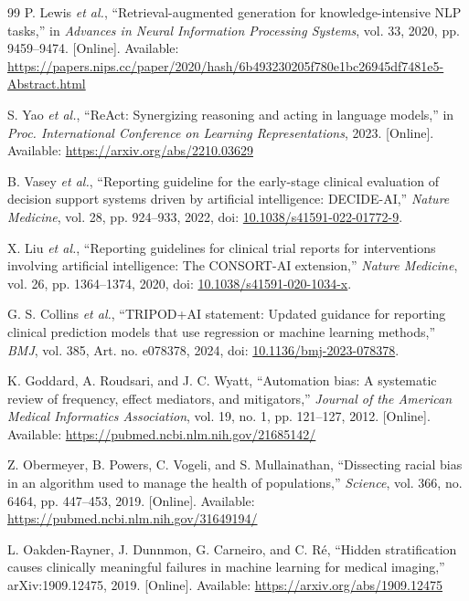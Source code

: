 \documentclass[conference]{IEEEtran}
\begin{document}
\begin{thebibliography}{99}
P. Lewis \emph{et al.}, ``Retrieval-augmented generation for knowledge-intensive NLP tasks,'' in \emph{Advances in Neural Information Processing Systems}, vol. 33, 2020, pp. 9459--9474. [Online]. Available: \url{https://papers.nips.cc/paper/2020/hash/6b493230205f780e1bc26945df7481e5-Abstract.html}

S. Yao \emph{et al.}, ``ReAct: Synergizing reasoning and acting in language models,'' in \emph{Proc. International Conference on Learning Representations}, 2023. [Online]. Available: \url{https://arxiv.org/abs/2210.03629}

B. Vasey \emph{et al.}, ``Reporting guideline for the early-stage clinical evaluation of decision support systems driven by artificial intelligence: DECIDE-AI,'' \emph{Nature Medicine}, vol. 28, pp. 924--933, 2022, doi: \href{https://doi.org/10.1038/s41591-022-01772-9}{10.1038/s41591-022-01772-9}.

X. Liu \emph{et al.}, ``Reporting guidelines for clinical trial reports for interventions involving artificial intelligence: The CONSORT-AI extension,'' \emph{Nature Medicine}, vol. 26, pp. 1364--1374, 2020, doi: \href{https://doi.org/10.1038/s41591-020-1034-x}{10.1038/s41591-020-1034-x}.

G. S. Collins \emph{et al.}, ``TRIPOD+AI statement: Updated guidance for reporting clinical prediction models that use regression or machine learning methods,'' \emph{BMJ}, vol. 385, Art. no. e078378, 2024, doi: \href{https://doi.org/10.1136/bmj-2023-078378}{10.1136/bmj-2023-078378}.

K. Goddard, A. Roudsari, and J. C. Wyatt, ``Automation bias: A systematic review of frequency, effect mediators, and mitigators,'' \emph{Journal of the American Medical Informatics Association}, vol. 19, no. 1, pp. 121--127, 2012. [Online]. Available: \url{https://pubmed.ncbi.nlm.nih.gov/21685142/}

Z. Obermeyer, B. Powers, C. Vogeli, and S. Mullainathan, ``Dissecting racial bias in an algorithm used to manage the health of populations,'' \emph{Science}, vol. 366, no. 6464, pp. 447--453, 2019. [Online]. Available: \url{https://pubmed.ncbi.nlm.nih.gov/31649194/}

L. Oakden-Rayner, J. Dunnmon, G. Carneiro, and C. R\'e, ``Hidden stratification causes clinically meaningful failures in machine learning for medical imaging,'' arXiv:1909.12475, 2019. [Online]. Available: \url{https://arxiv.org/abs/1909.12475}


\end{thebibliography}
\end{document}
